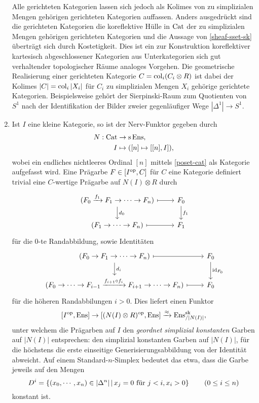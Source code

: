 \begin{enumerate}
  Alle gerichteten Kategorien lassen sich jedoch als Kolimes von zu
  simplizialen Mengen gehörigen gerichteten Kategorien
  auffassen. Anders ausgedrückt sind die gerichteten Kategorien die
  koreflektive Hülle in $\operatorname{Cat}$ der zu simplizialen Mengen gehörigen
  gerichteten Kategorien und die Aussage von \ref{sheaf-sset-sk}
  überträgt sich durch Kostetigkeit. Dies ist ein zur Konstruktion
  koreflektiver kartesisch abgeschlossener Kategorien aus
  Unterkategorien sich gut verhaltender topologischer Räume analoges
  Vorgehen. Die geometrische Realisierung einer gerichteten Kategorie
  $C = \operatorname{col}_i (C_i \otimes R)$ ist dabei der Kolimes $|C| = \operatorname{col}_i
  |X_i|$ für $C_i$ zu simplizialen Mengen $X_i$ gehörige gerichtete
  Kategorien. Beispielsweise gehört der Sierpinski-Raum zum Quotienten
  von $S^1$ nach der Identifikation der Bilder zweier gegenläufiger
  Wege $|\Delta^1| \to S^1$.
\item Ist $I$ eine kleine Kategorie, so ist der Nerv-Funktor gegeben
  durch 
  \begin{align*}
    N: \operatorname{Cat} &\to \operatorname{s}\operatorname{Ens}, \\
    I &\mapsto ([n] \mapsto [ [n], I]),
  \end{align*}
  wobei ein endliches nichtleeres Ordinal $[n]$ mittels
  \ref{poset-cat} als Kategorie aufgefasst wird. Eine Prägarbe $F \in
      [I^\mathrm{op}, C]$ für $C$ eine Kategorie definiert trivial eine
      $C$-wertige Prägarbe auf $N(I) \otimes R$ durch
  \[ \begin{tikzcd}
    (F_0 \xrightarrow{f_1} F_1 \to \cdots \to F_n) \dar{d_0} \rar[mapsto]
    & F_0 \dar{f_1} \\
    (F_1 \to \cdots \to F_n) \rar[mapsto]
    & F_1
  \end{tikzcd} \]
  für die $0$-te Randabbildung, sowie Identitäten
  \[ \begin{tikzcd}
    (F_0 \to F_1 \to \cdots \to F_n) \dar{d_i} \rar[mapsto]
    & F_0 \dar{\id_{F_0}} \\
    (F_0 \to \cdots \to F_{i-1}
    \xrightarrow{f_{i+1} \circ f_i} F_{i+1} \to \cdots \to F_n) \rar[mapsto]
    & F_0
  \end{tikzcd} \]
  für die höheren Randabbilungen $i > 0$. Dies liefert einen Funktor
  \[ [I^\mathrm{op}, \operatorname{Ens}] \to [(N(I) \otimes R)^\mathrm{op}, \operatorname{Ens}] \xrightarrow{\approx} \operatorname{Ens}^{\operatorname{sk}}_{/|N(I)|}, \]
  unter welchem die Prägarben auf $I$ den \emph{geordnet simplizial
    konstanten} Garben auf $|N(I)|$ entsprechen: den simplizial
  konstanten Garben auf $|N(I)|$, für die höchstens die erste
  einseitige Generisierungsabbildung von der Identität abweicht. Auf
  einem Standard-$n$-Simplex bedeutet das etwa, dass die Garbe jeweils
  auf den Mengen
  \[ D^i = \left\{ (x_0, \cdots, x_n) \in |\Delta^n| \,\middle|\, x_j = 0 \text{ für } j < i, x_i > 0  \right\} \qquad (0 \leq i \leq n)
    \]
  konstant ist.
\end{enumerate}

